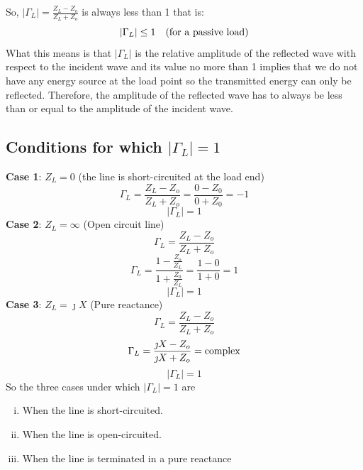 So, $	|\Gamma_L| = \frac{Z_L-Z_o}{Z_L+Z_o}$ is always less than 1 that is:
\begin{equation*}
|\Gamma_L|\leq 1\quad  (\textnormal{for  a  passive load})
\end{equation*}
What this means is that $|\Gamma_L|$ is the relative amplitude of the reflected wave with respect to the incident wave and its value no more than 1 implies that we do not have any energy source at the load point so the transmitted energy  can only be reflected. Therefore, the amplitude of the reflected wave has to always be less than or equal to the amplitude of the incident wave.

\subsection{Conditions for which $|\Gamma_L|=1$}
\textbf{Case 1}: $Z_L=0$ (the line is short-circuited at the load end)
\begin{equation*}	
\Gamma_L= \frac{Z_L -Z_o}{Z_L + Z_o} =  \frac{0 -Z_0}{0 + Z_0} = -1	
\end{equation*}
\begin{equation*}
|\Gamma_L|=1
\end{equation*}	
\textbf{Case 2}: $Z_L=\infty$ (Open circuit line)
\begin{equation*}
\Gamma_L= \frac{Z_L -Z_o}{Z_L + Z_o}
\end{equation*}
\begin{equation*}
\Gamma_L = \frac{1 -\frac{Z_o}{Z_L}}{1 + \frac{Z_0}{Z_L}} = \frac{1 - 0}{1 + 0} = 1
\end{equation*}
\begin{equation*}
|\Gamma_L| = 1
\end{equation*}
\textbf{Case 3}: $Z_L = \jmath X$ (Pure reactance)
\begin{equation*}
\Gamma_L= \frac{Z_L -Z_o}{Z_L + Z_o}
\end{equation*}
\begin{equation*}
\Gamma_L = \frac{\jmath X - Z_o}{\jmath X + Z_o} = \textnormal{complex}
\end{equation*}
\begin{equation*}
|\Gamma_L| = 1
\end{equation*}
So the three cases under which $|\Gamma_L|=1$ are
\begin{enumerate}[(i)]
\item When the line is short-circuited.
\item When the line is open-circuited.
\item When the line is terminated in a pure reactance
\end{enumerate}
